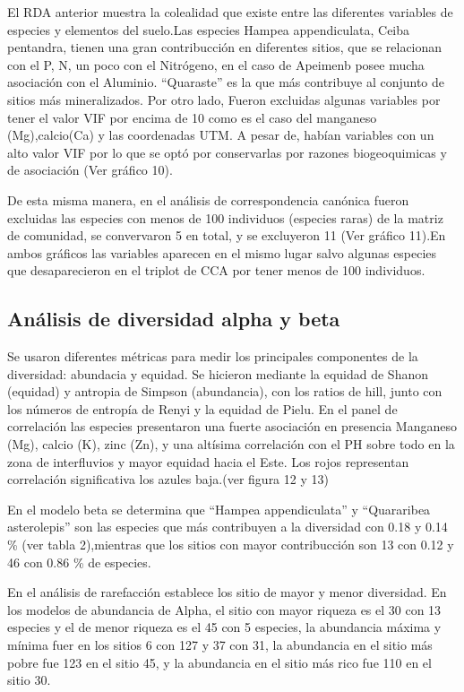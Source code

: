 \documentclass[11pt,]{article}
\begin{document}
El RDA anterior muestra la colealidad que existe entre las diferentes
variables de especies y elementos del suelo.Las especies Hampea
appendiculata, Ceiba pentandra, tienen una gran contribucción en
diferentes sitios, que se relacionan con el P, N, un poco con el
Nitrógeno, en el caso de Apeimenb posee mucha asociación con el
Aluminio. ``Quaraste'' es la que más contribuye al conjunto de sitios
más mineralizados. Por otro lado, Fueron excluidas algunas variables por
tener el valor VIF por encima de 10 como es el caso del manganeso
(Mg),calcio(Ca) y las coordenadas UTM. A pesar de, habían variables con
un alto valor VIF por lo que se optó por conservarlas por razones
biogeoquimicas y de asociación (Ver gráfico 10).

De esta misma manera, en el análisis de correspondencia canónica fueron
excluidas las especies con menos de 100 individuos (especies raras) de
la matriz de comunidad, se convervaron 5 en total, y se excluyeron 11
(Ver gráfico 11).En ambos gráficos las variables aparecen en el mismo
lugar salvo algunas especies que desaparecieron en el triplot de CCA por
tener menos de 100 individuos.

\subsection{Análisis de diversidad alpha y
beta}\label{anuxe1lisis-de-diversidad-alpha-y-beta}

Se usaron diferentes métricas para medir los principales componentes de
la diversidad: abundacia y equidad. Se hicieron mediante la equidad de
Shanon (equidad) y antropia de Simpson (abundancia), con los ratios de
hill, junto con los números de entropía de Renyi y la equidad de Pielu.
En el panel de correlación las especies presentaron una fuerte
asociación en presencia Manganeso (Mg), calcio (K), zinc (Zn), y una
altísima correlación con el PH sobre todo en la zona de interfluvios y
mayor equidad hacia el Este. Los rojos representan correlación
significativa los azules baja.(ver figura 12 y 13)

En el modelo beta se determina que ``Hampea appendiculata'' y
``Quararibea asterolepis'' son las especies que más contribuyen a la
diversidad con 0.18 y 0.14 \% (ver tabla 2),mientras que los sitios con
mayor contribucción son 13 con 0.12 y 46 con 0.86 \% de especies.

En el análisis de rarefacción establece los sitio de mayor y menor
diversidad. En los modelos de abundancia de Alpha, el sitio con mayor
riqueza es el 30 con 13 especies y el de menor riqueza es el 45 con 5
especies, la abundancia máxima y mínima fuer en los sitios 6 con 127 y
37 con 31, la abundancia en el sitio más pobre fue 123 en el sitio 45, y
la abundancia en el sitio más rico fue 110 en el sitio 30.
\end{document}
